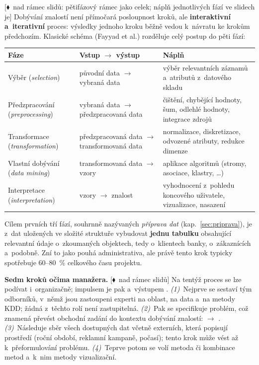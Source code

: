 \documentclass[11pt,a4paper]{article}
\theoremstyle{definition}
\newcommand{\mimo}{\textcolor{markcol}{\textsf{\footnotesize[$\blacklozenge$~nad rámec slidů]}}}
\newcommand{\mimoq}[1]{\textcolor{markcol}{\textsf{\footnotesize[$\blacklozenge$~nad rámec slidů: #1]}}}
\begin{document}
\mimoq{pětifázový rámec jako celek; náplň jednotlivých fází ve slidech je}
Dobývání znalostí není přímočará posloupnost kroků, ale \textbf{interaktivní
a~iterativní} proces: výsledky jednoho kroku běžně vedou k~návratu ke krokům předchozím.
Klasické schéma (Fayyad et al.) rozděluje celý postup do pěti fází:

\begin{center}
\small
\begin{tabular}{@{}p{3.3cm}p{4.2cm}p{7.6cm}@{}}
\toprule
\textbf{Fáze} & \textbf{Vstup $\to$ výstup} & \textbf{Náplň} \\
\midrule
Výběr (\emph{selection}) & původní data $\to$ vybraná data & výběr relevantních záznamů
  a~atributů z~datového skladu \\
Předzpracování (\emph{preprocessing}) & vybraná data $\to$ předzpracovaná data & čištění,
  chybějící hodnoty, šum, odlehlé hodnoty, integrace zdrojů \\
Transformace (\emph{transformation}) & předzpracovaná data $\to$ transformovaná data &
  normalizace, diskretizace, odvozené atributy, redukce dimenze \\
Vlastní dobývání (\emph{data mining}) & transformovaná data $\to$ vzory & aplikace
  algoritmů (stromy, asociace, klastry, \dots) \\
Interpretace (\emph{interpretation}) & vzory $\to$ znalost & vyhodnocení z~pohledu
  koncového uživatele, vizualizace, nasazení \\
\bottomrule
\end{tabular}
\end{center}

Cílem prvních tří fází, souhrnně nazývaných \emph{příprava dat} (kap.~\ref{sec:priprava}),
je z~dat uložených ve složité struktuře vybudovat \textbf{jednu tabulku} obsahující
relevantní údaje o~zkoumaných objektech, tedy o~klientech banky, o~zákaznících a~podobně.
Zní to jako pouhá administrativa, ale právě tento krok typicky spotřebuje 60--80~\%
celkového času projektu.

\textbf{Sedm kroků očima manažera.} \mimo{} Na tentýž proces se lze podívat i~organizačně;
impulsem je pak  a~výstupem .
\emph{(1)}~Nejprve se sestaví tým odborníků, v~němž jsou zastoupeni experti na oblast, na
data a~na metody KDD; žádná z~těchto rolí není zastupitelná. \emph{(2)}~Pak se specifikuje
problém, což znamená převést obchodní zadání do kontextu dobývání znalostí:  $\to$ .
\emph{(3)}~Následuje sběr všech dostupných dat včetně externích, která popisují prostředí
(roční období, reklamní kampaně, počasí); tento krok může vést až k~přeformulování
problému. \emph{(4)}~Teprve potom se volí metoda či kombinace metod a~k~nim metody
vizualizační.
\end{document}
